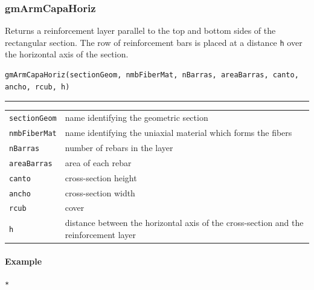 \subsubsection{gmArmCapaHoriz}
Returns a reinforcement layer parallel to the top and bottom sides of the rectangular section. The row of reinforcement bars is placed at a distance {\tt h} over the horizontal axis of the section. 
\noindent 
\begin{verbatim}
gmArmCapaHoriz(sectionGeom, nmbFiberMat, nBarras, areaBarras, canto, ancho, rcub, h)
\end{verbatim}
\vspace{-10pt}
{\color{grayLines} \rule{\linewidth}{0.25pt}}
\begin{center}
\begin{tabular}{lp{10cm}}
{\tt sectionGeom} & name identifying the geometric section \\
{\tt nmbFiberMat} & name identifying the uniaxial material which forms the fibers\\
{\tt nBarras} & number of rebars in the layer \\
{\tt areaBarras} &  area of each rebar \\
{\tt canto} &  cross-section height \\
{\tt ancho} & cross-section width \\
{\tt rcub} & cover \\
{\tt h} & distance between the horizontal axis of the cross-section and the reinforcement layer \\
\end{tabular}
\end{center}
\paragraph{Example}
\begin{verbatim}
*
\end{verbatim}

